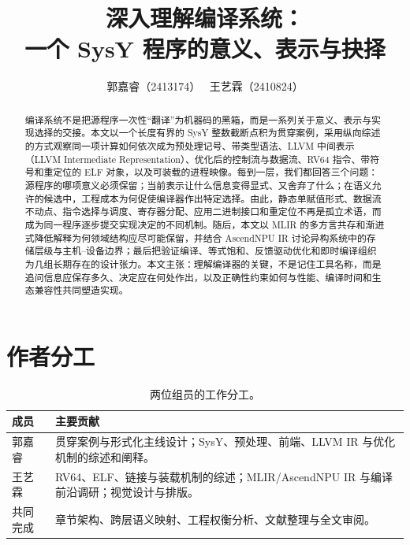 \documentclass[a4paper,runningheads]{llncs}
\title{\texorpdfstring{深入理解编译系统：\\[0.15em]一个 SysY 程序的意义、表示与抉择}{深入理解编译系统：一个 SysY 程序的意义、表示与抉择}}
\author{郭嘉睿（2413174） \   王艺霖（2410824）}
\institute{编译系统原理上机大作业预备工作}
\begin{document}
\maketitle

\begin{abstract}
编译系统不是把源程序一次性“翻译”为机器码的黑箱，而是一系列关于意义、表示与实现选择的交接。本文以一个长度有界的 SysY 整数截断点积为贯穿案例，采用纵向综述的方式观察同一项计算如何依次成为预处理记号、带类型语法、LLVM 中间表示（LLVM Intermediate Representation）、优化后的控制流与数据流、RV64 指令、带符号和重定位的 ELF 对象，以及可装载的进程映像。每到一层，我们都回答三个问题：源程序的哪项意义必须保留；当前表示让什么信息变得显式、又舍弃了什么；在语义允许的候选中，工程成本为何促使编译器作出特定选择。由此，静态单赋值形式、数据流不动点、指令选择与调度、寄存器分配、应用二进制接口和重定位不再是孤立术语，而成为同一程序逐步提交实现决定的不同机制。随后，本文以 MLIR 的多方言共存和渐进式降低解释为何领域结构应尽可能保留，并结合 AscendNPU IR 讨论异构系统中的存储层级与主机--设备边界；最后把验证编译、等式饱和、反馈驱动优化和即时编译组织为几组长期存在的设计张力。本文主张：理解编译器的关键，不是记住工具名称，而是追问信息应保存多久、决定应在何处作出，以及正确性约束如何与性能、编译时间和生态兼容性共同塑造实现。

\end{abstract}

\section*{作者分工}
\begin{table}[H]
  \centering
  \caption{两位组员的工作分工。}
  \label{tab:contributions}
  \begin{tabularx}{\textwidth}{@{}p{}X@{}}
    \toprule
    成员 & 主要贡献 \\
    \midrule
    郭嘉睿 & 贯穿案例与形式化主线设计；SysY、预处理、前端、LLVM IR 与优化机制的综述和阐释。\\
    王艺霖 & RV64、ELF、链接与装载机制的综述；MLIR/AscendNPU IR 与编译前沿调研；视觉设计与排版。\\
    共同完成 & 章节架构、跨层语义映射、工程权衡分析、文献整理与全文审阅。\\
    \bottomrule
  \end{tabularx}
\end{table}











\end{document}

